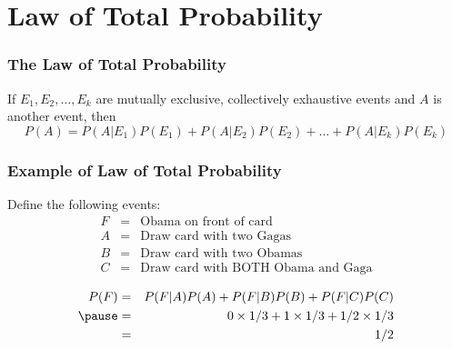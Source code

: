 \section{Law of Total Probability}



\begin{frame}
\frametitle{The Law of Total Probability}
If $E_1, E_2, \hdots, E_k$ are mutually exclusive, collectively exhaustive events and $A$ is another event, then
	$$P(A) = P(A|E_1)P(E_1) + P(A|E_2)P(E_2) + \hdots + P(A|E_k)P(E_k)$$

\end{frame}
\begin{frame}
  \frametitle{Example of Law of Total Probability}
  Define the following events:
  \begin{eqnarray*}
    F &=&  \mbox{Obama on front of card}\\
    A &=&  \mbox{Draw card with two Gagas}\\
    B &=&  \mbox{Draw card with two Obamas}\\
    C &=&  \mbox{Draw card with BOTH Obama and Gaga}\\
  \end{eqnarray*}
  \begin{eqnarray*}
  P(F) &=& P(F|A)P(A) + P(F|B)P(B) + P(F|C)P(C) \\ \pause
  &=& 0 \times 1/3 + 1 \times 1/3 + 1/2 \times 1/3 \\
  &=& 1/2
  \end{eqnarray*}

\end{frame}
\def\EventA{(-0.35,0) circle (1.2)}
\def\EventB{(1.35,0) circle (1.2)}
\def\EventC{(-0.35,0) circle (0.6)}
\def\EventD{(0,0) circle (1.6)}
\def\SampleSpace{(-2,-2) rectangle (3,2)}
